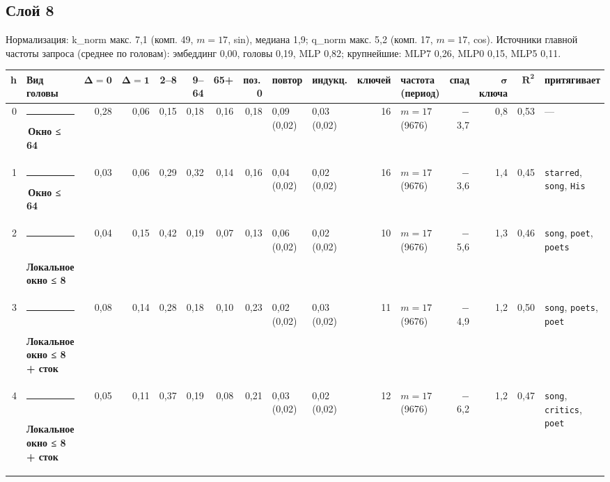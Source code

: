 \documentclass[10pt]{article}
\begin{document}
\noindent\begin{minipage}{\linewidth}
\subsection*{Слой 8}
{\small\color{ink2} Нормализация: k\_norm макс. 7,1 (комп. 49, $m{=}17$, sin), медиана 1,9; q\_norm макс. 5,2 (комп. 17, $m{=}17$, cos). Источники главной частоты запроса (среднее по головам): эмбеддинг 0,00, головы 0,19, MLP 0,82; крупнейшие: MLP7 0,26, MLP0 0,15, MLP5 0,11.}
\begin{center}{\footnotesize\begin{tabular}{|r|l|r|r|r|r|r|r|l|l|r|l|r|r|r|l|}
\hline
\rowcolor{head}\textbf{h} & \textbf{Вид головы} & $\boldsymbol{\Delta{=}0}$ & $\boldsymbol{\Delta{=}1}$ & \textbf{2–8} & \textbf{9–64} & \textbf{65+} & \textbf{поз.\,0} & \textbf{повтор} & \textbf{индукц.} & \textbf{ключей} & \textbf{частота (период)} & \textbf{спад} & $\boldsymbol{\sigma}$ \textbf{ключа} & $\boldsymbol{R^2}$ & \textbf{притягивает} \\ \hline
0 & \textcolor[HTML]{EDA100}{\rule{0.62em}{0.62em}}\,\textbf{Окно ≤ 64} & 0,28 & 0,06 & 0,15 & 0,18 & 0,16 & 0,18 & 0,09 (0,02) & 0,03 (0,02) & 16 & $m{=}17$ (9676) & $-$3,7 & 0,8 & 0,53 & — \\ \hline
1 & \textcolor[HTML]{EDA100}{\rule{0.62em}{0.62em}}\,\textbf{Окно ≤ 64} & 0,03 & 0,06 & 0,29 & 0,32 & 0,14 & 0,16 & 0,04 (0,02) & 0,02 (0,02) & 16 & $m{=}17$ (9676) & $-$3,6 & 1,4 & 0,45 & \texttt{\textvisiblespace{}starred}, \texttt{\textvisiblespace{}song}, \texttt{\textvisiblespace{}His} \\ \hline
2 & \textcolor[HTML]{1BAF7A}{\rule{0.62em}{0.62em}}\,\textbf{Локальное окно ≤ 8} & 0,04 & 0,15 & 0,42 & 0,19 & 0,07 & 0,13 & 0,06 (0,02) & 0,02 (0,02) & 10 & $m{=}17$ (9676) & $-$5,6 & 1,3 & 0,46 & \texttt{\textvisiblespace{}song}, \texttt{\textvisiblespace{}poet}, \texttt{\textvisiblespace{}poets} \\ \hline
3 & \textcolor[HTML]{1BAF7A}{\rule{0.62em}{0.62em}}\,\textbf{Локальное окно ≤ 8 + сток} & 0,08 & 0,14 & 0,28 & 0,18 & 0,10 & 0,23 & 0,02 (0,02) & 0,03 (0,02) & 11 & $m{=}17$ (9676) & $-$4,9 & 1,2 & 0,50 & \texttt{\textvisiblespace{}song}, \texttt{\textvisiblespace{}poets}, \texttt{\textvisiblespace{}poet} \\ \hline
4 & \textcolor[HTML]{1BAF7A}{\rule{0.62em}{0.62em}}\,\textbf{Локальное окно ≤ 8 + сток} & 0,05 & 0,11 & 0,37 & 0,19 & 0,08 & 0,21 & 0,03 (0,02) & 0,02 (0,02) & 12 & $m{=}17$ (9676) & $-$6,2 & 1,2 & 0,47 & \texttt{\textvisiblespace{}song}, \texttt{\textvisiblespace{}critics}, \texttt{\textvisiblespace{}poet} \\ \hline

\end{tabular}}
\end{center}
\end{minipage}
\end{document}
